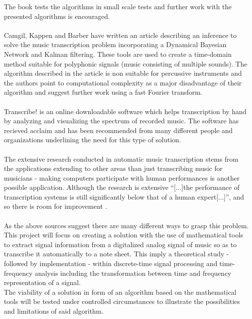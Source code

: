 The book tests the algorithms in small scale tests and further work with the presented algorithms is encouraged.
\\\\
Camgil, Kappen and Barber have written an article \cite{sol2} describing an inference to solve the music transcription problem incorporating a Dynamical Bayesian Network and Kalman filtering.
These tools are used to create a time-domain method suitable for polyphonic signals (music consisting of multiple sounds). 
The algorithm described in the article is non suitable for percussive instruments and the authors point to computational complexity as a major disadvantage of their algorithm and suggest further work using a fast Fourier transform.
\\\\
Transcribe! \cite{transcribe!} is an online downloadable software which helps transcription by hand by analyzing and visualizing the spectrum of recorded music. The software has recieved acclaim and has been recommended from many different people and organizations underlining the need for this type of solution.
\\\\
The extensive research conducted in automatic music transcription stems from the applications extending to other areas than just transcribing music for musicians - making computers participate with human performances is another possible application. Although the research is extensive ``[$\ldots$]the performance of transcription systems is still significantly below that of a human expert[$\ldots$]'', and so there is room for improvement \cite{future}.
\\\\
As the above sources suggest there are many different ways to grasp this problem.\\
This project will focus on creating a solution with the use of mathematical tools to extract signal information from a digitalized analog signal of music so as to transcribe it automatically to a note sheet.  
This imply a theoretical study - followed by implementation - within discrete-time signal processing and time-frequency analysis including the transformation between time and frequency representation of a signal.\\    
The viability of a solution in form of an algorithm based on the mathematical tools will be tested under controlled circumstances to illustrate the possibilities and limitations of said algorithm.

